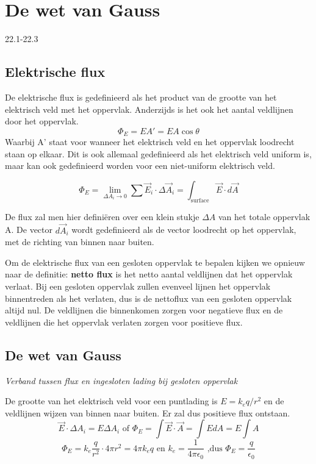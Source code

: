 \documentclass[12pt,a4paper]{article}
\begin{document}
    \section{De wet van Gauss}
    22.1-22.3

    \subsection{Elektrische flux}
    De elektrische flux is gedefinieerd als het product van de grootte van het elektrisch veld met het oppervlak. Anderzijds is het ook het aantal veldlijnen door het oppervlak. 
    \[\Phi_E = EA' = EA\cos\theta\]
    Waarbij A' staat voor wanneer het elektrisch veld en het oppervlak loodrecht staan op elkaar. Dit is ook allemaal gedefinieerd als het elektrisch veld uniform is, maar kan ook gedefinieerd worden voor een niet-uniform elektrisch veld.
    
    \[\Phi_E = \lim_{\Delta A_i \rightarrow 0} \sum \vec{E}_i \cdot \Delta\vec{A}_i = \int_{\text{surface}} \vec{E}\cdot d\vec{A}\]
    
    De flux zal men hier definiëren over een klein stukje $\Delta A$ van het totale oppervlak A. De vector $d\vec{A}_i$ wordt gedefinieerd als de vector loodrecht op het oppervlak, met de richting van binnen naar buiten.
    
    Om de elektrische flux van een gesloten oppervlak te bepalen kijken we opnieuw naar de definitie: \textbf{netto flux} is het netto aantal veldlijnen dat het oppervlak verlaat. Bij een gesloten oppervlak zullen evenveel lijnen het oppervlak binnentreden als het verlaten, dus is de nettoflux van een gesloten oppervlak altijd nul. De veldlijnen die binnenkomen zorgen voor negatieve flux en de veldlijnen die het oppervlak verlaten zorgen voor positieve flux.
    
    \subsection{De wet van Gauss}
    \textit{Verband tussen flux en ingesloten lading bij gesloten oppervlak}
    
    De grootte van het elektrisch veld voor een puntlading is \(E = k_e q/r^2\) en de veldlijnen wijzen van binnen naar buiten. Er zal dus positieve flux ontstaan. 
   	\[\vec{E}\cdot\Delta A_i = E\Delta A_i \text{  of  } \Phi_E = \int\vec{E}\cdot\vec{A} = \int EdA = E\int A\]
   	\[\Phi_E = k_e\frac{q}{r^2}\cdot 4\pi r^2 = 4\pi k_eq \text{  en  } k_e = \frac{1}{4\pi\epsilon_0} \text{  ,dus  } \Phi_E = \frac{q}{\epsilon_0}\]
   	
\end{document}
